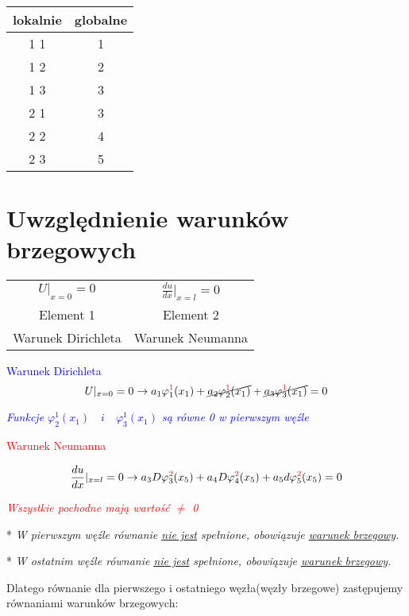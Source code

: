 \documentclass[9pt, a4paper]{article}
\begin{document}
\begin{center}
\begin{tabular}{ c | c }
lokalnie & globalne\\
\hline
1 1 & 1\\
1 2 & 2\\
\color{cyan}1 3 &\color{cyan}3\\
\hline
\color{cyan}2 1 &\color{cyan}3\\
2 2 & 4\\
2 3 & 5\\
\hline
\end{tabular}
\end{center}

\newpage
\section*{Uwzględnienie warunków brzegowych}
\begin{center}
\begin{tabular}{|| c | c ||}
\hline
\(U|_{x=0}=0\) & \(\frac{du}{dx}|_{x=l}=0\)\\
Element 1 & Element 2\\
Warunek Dirichleta & Warunek Neumanna\\
\hline
\end{tabular}
\end{center}


\textcolor{blue}{Warunek Dirichleta}
\[U|_{x=0}=0\to a_1\varphi_1^{\textcolor{red}{1}}(x_1)+\cancel{a_2\varphi_2^{\textcolor{red}{1}}(x_1)}+\cancel{a_3\varphi_3^{\textcolor{red}{1}}(x_1)}=0\]

\textcolor{blue}{\emph{Funkcje $\varphi_2^1(x_1)\quad i\quad\varphi_3^1(x_1)$ są równe 0 w pierwszym węźle}}
\hfill\break

\textcolor{red}{Warunek Neumanna}

\[\frac{du}{dx}|_{x=l}=0\to a_3D\varphi_3^{\textcolor{red}{2}}(x_5)+a_4D\varphi_4^{\textcolor{red}{2}}(x_5)+a_5d\varphi_5^{\textcolor{red}{2}}(x_5)=0\]

\textcolor{red}{\emph{Wszystkie pochodne mają wartość $\ne$ 0}}

* \emph{W pierwszym węźle równanie \underline{\underline{nie jest}} spełnione, obowiązuje \underline{\underline{warunek brzegowy}}.}

* \emph{W ostatnim węźle równanie \underline{\underline{nie jest}} spełnione, obowiązuje \underline{\underline{warunek brzegowy}}.}


Dlatego równanie dla pierwszego i ostatniego węzła(węzły brzegowe) zastępujemy równaniami warunków brzegowych:
\end{document}
